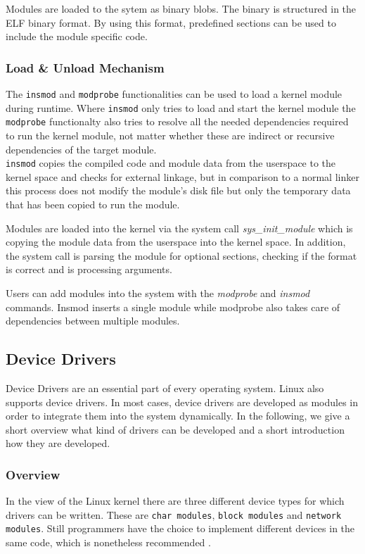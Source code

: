 \documentclass{sig-alternate-05-2015}
\begin{document}

Modules are loaded to the sytem as binary blobs. The binary is structured in the ELF binary format. By using this format, predefined sections can be used to include the module specific code. \\


\subsubsection{Load \& Unload Mechanism}
The \texttt{insmod} and \texttt{modprobe} functionalities can be used to load a kernel module during runtime. Where \texttt{insmod} only tries to load and start the kernel module the \texttt{modprobe} functionalty also tries to resolve all the needed dependencies required to run the kernel module, not matter whether these are indirect or recursive dependencies of the target module. \\
\texttt{insmod} copies the compiled code and module data from the userspace to the kernel space and checks for external linkage, but in comparison to a normal linker this process does not modify the module's disk file but only the temporary data that has been copied to run the module.

Modules are loaded into the kernel via the system call \emph{sys\_init\_module} which is copying the module data from the userspace into the kernel space. In addition, the system call is parsing the module for optional sections, checking if the format is correct and is processing arguments. 

Users can add modules into the system with the \emph{modprobe} and \emph{insmod} commands. Insmod inserts a single module while modprobe also takes care of dependencies between multiple modules.

\subsection{Device Drivers}
Device Drivers are an essential part of every operating system. Linux also supports device drivers. In most cases, device drivers are developed as modules in order to integrate them into the system dynamically. In the following, we give a short overview what kind of drivers can be developed and a short introduction how they are developed. 
\subsubsection{Overview}
In the view of the Linux kernel there are three different device types for which drivers can be written. These are \texttt{char modules}, \texttt{block modules} and \texttt{network modules}. Still programmers have the choice to implement different devices in the same code, which is nonetheless recommended \cite{Corbet:2005:LDD:1209083}.
\end{document}
